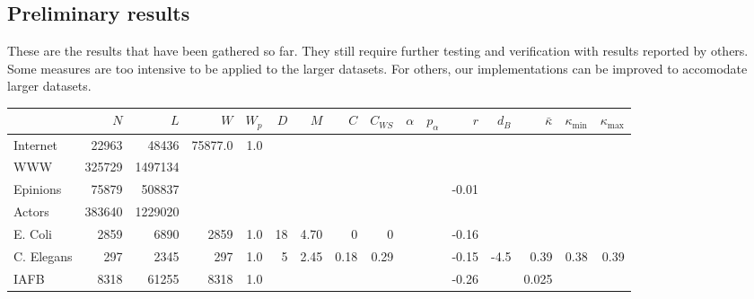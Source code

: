 \documentclass{article}
\theoremstyle{definition}
\begin{document}
\begin{landscape}

\section*{Preliminary results}

These are the results that have been gathered so far. They still require further testing and verification with results reported by others. Some measures are too intensive to be applied to the larger datasets. For others, our implementations can be improved to accomodate larger datasets.

\begin{tabular}{l | r r r r r r r r r r r r r r r }
  \hline
    & $N$ & $L$ & $W$ & $W_p$ & $D$ & $M$ & $C$ & $C_{WS}$ & $\alpha$ & $p_\alpha$ & $r$ & $d_B$ & $\bar{\kappa}$ & $\kappa_{\mbox{min}}$ & $\kappa_{\mbox{max}}$  \\
    \hline
 Internet & 22963 & 48436 & 75877.0 & 1.0 & & & & & & & & & & & \\   
 WWW & 325729 & 1497134 & & & & & & & & & & & & & \\
 Epinions & 75879 & 508837 & & & & & & & & & -0.01 & & & & \\ 
 Actors  & 383640 & 1229020 & & & & & & & & & & & & & \\
 E. Coli  & 2859 & 6890 & 2859 & 1.0 & 18 & 4.70 & 0 & 0 & & & -0.16 & & & & \\
 C. Elegans  & 297 & 2345 & 297 & 1.0 & 5 & 2.45 & 0.18 & 0.29 & & & -0.15 & -4.5 & 0.39 & 0.38 & 0.39 \\
 IAFB  & 8318 & 61255 & 8318 & 1.0 & & & & & & & -0.26 & & 0.025 & &  \\ 
 \hline

\end{tabular}

\end{landscape}



\end{document}

